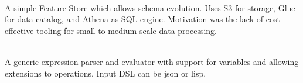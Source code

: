 \documentclass[]{deedy-resume-openfont}
\begin{document}
\hfill {}\\
A simple Feature-Store which allows schema evolution. Uses S3 for storage, Glue for data catalog, and Athena as SQL engine. Motivation was the lack of cost effective tooling for small to medium scale data processing.\\
\sectionsep
  

\hfill {}\\
A generic expression parser and evaluator with support for variables and allowing extensions to operations. Input DSL can be json or lisp.\\
\sectionsep
\end{document}
